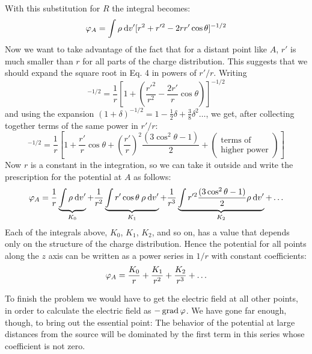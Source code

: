 With this substitution for $R$ the integral becomes:
\begin{equation}
  \varphi_A = \int \rho\:\textup{d} v'[r^2 + r'^2 - 2rr'\cos\theta]^{-1/2}
\end{equation}
Now we want to take advantage of the fact that for a distant point
like $A$, $r'$ is much smaller than $r$ for all parts of the charge distribution.
This suggests that we should expand the square root in Eq. 4 in
powers of $r'/r$. Writing
\begin{equation}
  [r^2 + r'^2 - 2rr'\cos\theta]^{-1/2} 
      = \frac{1}{r}\left[1+\left(\frac{r'^2}{r^2}-\frac{2r'}{r}\cos\theta\right)\right]^{-1/2}
\end{equation}
and using the expansion $(1+\delta)^{-1/2}=1-\frac{1}{2}\delta+\frac{3}{8}\delta^2\ldots$, we get,
after collecting together terms of the same power in $r'/r$:
\begin{equation}
  [r^2 + r'^2 - 2rr'\cos\theta]^{-1/2}
   = \frac{1}{r}\left[1+\frac{r'}{r}\cos\theta
                       +\left(\frac{r'}{r}\right)^2\frac{(3\cos^2\theta-1)}{2}
                       +\left(\begin{array}{cc}\text{terms of}\\\text{higher power}\end{array}\right)\right]
\end{equation}
Now $r$ is a constant in the integration, so we can take it outside and
write the prescription for the potential at $A$ as follows:
\begin{equation}
  \varphi_A =
        \frac{1}{r}  \underbrace{\int\rho\:\textup{d} v'}_{K_0}
       +\frac{1}{r^2}\underbrace{\int r'\cos\theta\:\rho\:\textup{d} v'}_{K_1}
       +\frac{1}{r^3}\underbrace{\int r'^2\frac{(3\cos^2\theta-1)}{2}\rho\:\textup{d} v'}_{K_2}
       +\ldots
\end{equation}
Each of the integrals above, $K_0$, $K_1$, $K_2$, and so on, has a value that
depends only on the structure of the charge distribution. Hence the
potential for all points along the $z$ axis can be written as a power series
in $1/r$ with constant coefficients:
\begin{equation}
  \varphi_A = \frac{K_0}{r}+\frac{K_1}{r^2}+\frac{K_2}{r^3}+\ldots
\end{equation}

To finish the problem we would have to get the electric field at all
other points, in order to calculate the electric field as  $-\operatorname{grad}\varphi$. We
have gone far enough, though, to bring out the essential point: The
behavior of the potential at large distances from the source will be
dominated by the first term in this series whose coefficient is not zero.

